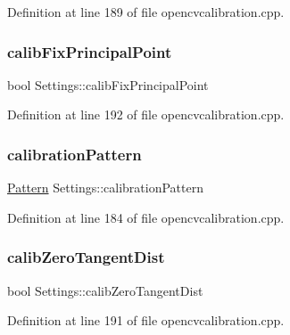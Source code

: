Definition at line 189 of file opencvcalibration.\+cpp.

\mbox{\label{class_settings_a44397eea3f08a0c78808c38bdd716594}} 
\subsubsection{\texorpdfstring{calibFixPrincipalPoint}{calibFixPrincipalPoint}}
{\footnotesize\ttfamily bool Settings\+::calib\+Fix\+Principal\+Point}



Definition at line 192 of file opencvcalibration.\+cpp.

\mbox{\label{class_settings_a94551b7ffe8ac60311b035b2905e9498}} 
\subsubsection{\texorpdfstring{calibrationPattern}{calibrationPattern}}
{\footnotesize\ttfamily \mbox{\hyperlink{class_settings_a0e7117abd9427a6f8bc1d1d8d456b5c8}{Pattern}} Settings\+::calibration\+Pattern}



Definition at line 184 of file opencvcalibration.\+cpp.

\mbox{\label{class_settings_a4bc7ff147d74721a3587ce6fcb64ef32}} 
\subsubsection{\texorpdfstring{calibZeroTangentDist}{calibZeroTangentDist}}
{\footnotesize\ttfamily bool Settings\+::calib\+Zero\+Tangent\+Dist}



Definition at line 191 of file opencvcalibration.\+cpp.

\mbox{\label{class_settings_af32a5ff06192bde106c934e0361bcd7e}} 
